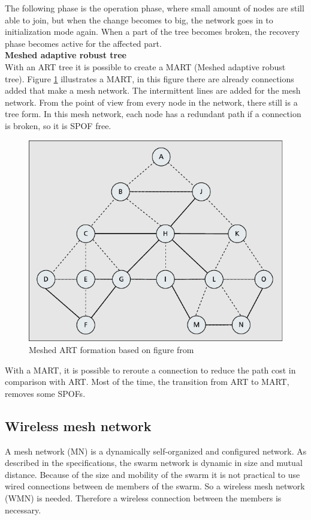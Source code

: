 \documentclass[10pt,a4paper]{article}
\begin{document}
The following phase is the operation phase, where small amount of nodes are still able to join, but when the change becomes to big, the network goes in to initialization mode again. When a part of the tree becomes broken, the recovery phase becomes active for the affected part.\\

\textbf{Meshed adaptive robust tree}\\
With an ART tree it is possible to create a MART (Meshed adaptive robust tree). Figure \ref{fig:meshtree} illustrates a MART, in this figure there are already connections added that make a mesh network. The intermittent lines are added for the mesh network. From the point of view from every node in the network, there still is a tree form. In this mesh network, each node has a redundant path if a connection is broken, so it is SPOF free.

\begin{figure}[H]
   \centering
   \includegraphics[width=1\textwidth]{meshtree}
   \caption{Meshed ART formation based on figure from \cite{emergingstandarsforwirelessmeshtechnology}}
   \label{fig:meshtree}
\end{figure}

With a MART, it is possible to reroute a connection to reduce the path cost in comparison with ART. Most of the time, the transition from ART to MART, removes some SPOFs.

\subsection{Wireless mesh network}
A mesh network (MN) is a dynamically self-organized and configured network. \cite{WMN1} As described in the specifications, the swarm network is dynamic in size and mutual distance. Because of the size and mobility of the swarm it is not practical to use wired connections between de members of the swarm. So a wireless mesh network (WMN) is needed. Therefore a wireless connection between the members is necessary.
\end{document}

